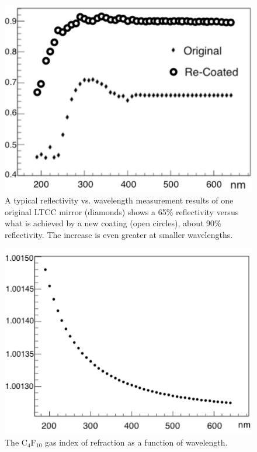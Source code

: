 \begin{figure}
	\centering
	\includegraphics[width=0.98\columnwidth, height=0.7\columnwidth]{img/reflectivityGain.png}
	\caption{A typical reflectivity vs. wavelength measurement results of one original LTCC mirror (diamonds) shows a
          65\% reflectivity versus what is achieved by a new coating (open circles), about 90\% reflectivity. The
          increase is even greater at smaller wavelengths.}
	\label{fig:reflectivityGain}
\end{figure}

\begin{figure}[b]
	\centering
	\includegraphics[width=0.98\columnwidth, height=0.65\columnwidth]{img/c4f10RefrIndex.png}
	\caption{The C$_4$F$_{10}$ gas index of refraction as a function of wavelength.}
	\label{fig:c4f10RefrIndex}
\end{figure}

